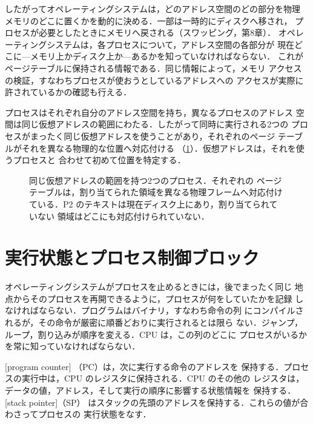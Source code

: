 \documentclass[../main.tex]{subfiles}
\begin{document}
したがってオペレーティングシステムは，どのアドレス空間のどの部分を物理
メモリのどこに置くかを動的に決める．一部は一時的にディスクへ移され，
プロセスが必要としたときにメモリへ戻される（スワッピング，第8章）．
オペレーティングシステムは，各プロセスについて，アドレス空間の各部分が
現在どこに---メモリ上かディスク上か---あるかを知っていなければならない．
これがページテーブルに保持される情報である．同じ情報によって，メモリ
アクセスの検証，すなわちプロセスが使おうとしているアドレスへの
アクセスが実際に許されているかの確認も行える．

プロセスはそれぞれ自分のアドレス空間を持ち，異なるプロセスのアドレス
空間は同じ仮想アドレスの範囲にわたる．したがって同時に実行される2つの
プロセスがまったく同じ仮想アドレスを使うことがあり，それぞれのページ
テーブルがそれを異なる物理的な位置へ対応付ける
（\cref{fig:l02-address-mapping}）．仮想アドレスは，それを使うプロセスと
合わせて初めて位置を特定する．

\begin{figure}[htbp]
  \centering
  
  \caption{同じ仮想アドレスの範囲を持つ2つのプロセス．それぞれの
    ページテーブルは，割り当てられた領域を異なる物理フレームへ対応付け
    ている．P2 のテキストは現在ディスク上にあり，割り当てられていない
    領域はどこにも対応付けられていない．}
  \label{fig:l02-address-mapping}
\end{figure}

\section{実行状態とプロセス制御ブロック}
\label{sec:l02-pcb}

オペレーティングシステムがプロセスを止めるときには，後でまったく同じ
地点からそのプロセスを再開できるように，プロセスが何をしていたかを記録
しなければならない．プログラムはバイナリ，すなわち命令の列
にコンパイルされるが，その命令が厳密に順番どおりに実行されるとは限ら
ない．ジャンプ，ループ，割り込みが順序を変える．CPU は，この列のどこに
プロセスがいるかを常に知っていなければならない．

[program counter]%
（PC）は，次に実行する命令のアドレスを
保持する．プロセスの実行中は，CPU のレジスタに保持される．CPU のその他の
レジスタは，データの値，アドレス，そして実行の順序に影響する状態情報を
保持する．[stack pointer]（SP）
はスタックの先頭のアドレスを保持する．これらの値が合わさってプロセスの
実行状態をなす．
\end{document}

